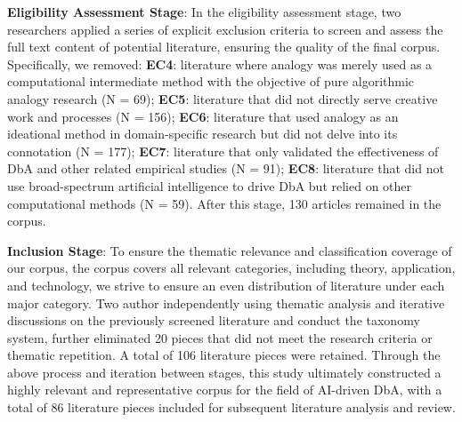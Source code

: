 \textbf{Eligibility Assessment Stage}:
In the eligibility assessment stage, two researchers applied a series of explicit exclusion criteria to screen and assess the full text content of potential literature, ensuring the quality of the final corpus. Specifically, we removed: \textbf{EC4}: literature where analogy was merely used as a computational intermediate method with the objective of pure algorithmic analogy research (N = 69); \textbf{EC5}: literature that did not directly serve creative work and processes\cite{hsueh2024counts} (N = 156); \textbf{EC6}: literature that used analogy as an ideational method in domain-specific research but did not delve into its connotation (N = 177); \textbf{EC7}: literature that only validated the effectiveness of DbA and other related empirical studies (N = 91); \textbf{EC8}: literature that did not use broad-spectrum artificial intelligence to drive DbA but relied on other computational methods (N = 59). After this stage, 130 articles remained in the corpus.

\textbf{Inclusion Stage}:
To ensure the thematic relevance and classification coverage of our corpus, the corpus covers all relevant categories, including theory, application, and technology, we strive to ensure an even distribution of literature under each major category. Two author independently using thematic analysis\cite{terry2017thematic} and iterative discussions on the previously screened literature and conduct the taxonomy system, further eliminated 20 pieces that did not meet the research criteria or thematic repetition. A total of 106 literature pieces were retained.
Through the above process and iteration between stages, this study ultimately constructed a highly relevant and representative corpus for the field of AI-driven DbA, with a total of 86 literature pieces included for subsequent literature analysis and review.


